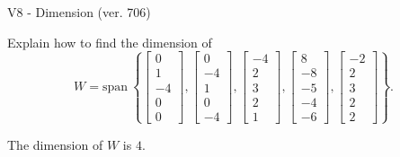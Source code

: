 \begin{exercise}
  \begin{exerciseTitle}V8 - Dimension (ver. 706)\end{exerciseTitle}
  \begin{exerciseStatement}
    Explain how to find the dimension of 
\[W=\mathrm{span}\ \left\{\left[\begin{array}{r}
0 \\
1 \\
-4 \\
0 \\
0
\end{array}\right] , \left[\begin{array}{r}
0 \\
-4 \\
1 \\
0 \\
-4
\end{array}\right] , \left[\begin{array}{r}
-4 \\
2 \\
3 \\
2 \\
1
\end{array}\right] , \left[\begin{array}{r}
8 \\
-8 \\
-5 \\
-4 \\
-6
\end{array}\right] , \left[\begin{array}{r}
-2 \\
2 \\
3 \\
2 \\
2
\end{array}\right]\right\}.\]



  \end{exerciseStatement}
  \begin{exerciseAnswer}
   The dimension of \(W\) is  \(4\).
  


  \end{exerciseAnswer}
\end{exercise}
